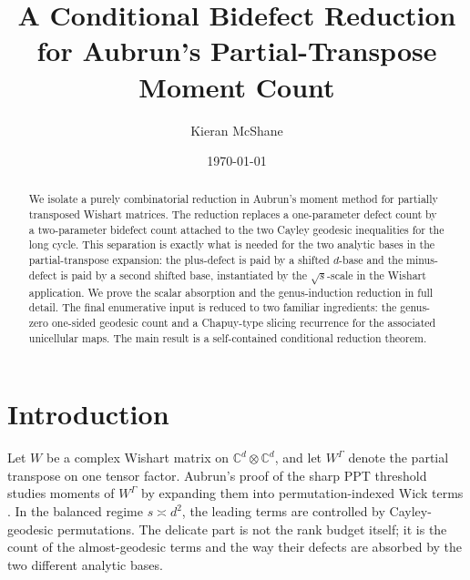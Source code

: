 \documentclass[11pt]{article}
\title{A Conditional Bidefect Reduction for Aubrun's Partial-Transpose Moment Count}
\author{Kieran McShane}
\date{\today}
\numberwithin{equation}{section}
\newcommand{\C}{\mathbb C}
\begin{document}
\maketitle

\begin{abstract}
We isolate a purely combinatorial reduction in Aubrun's moment method for
partially transposed Wishart matrices.  The reduction replaces a one-parameter
defect count by a two-parameter bidefect count attached to the two Cayley
geodesic inequalities for the long cycle.  This separation is exactly what is
needed for the two analytic bases in the partial-transpose expansion: the
plus-defect is paid by a shifted \(d\)-base and the minus-defect is paid by a
second shifted base, instantiated by the \(\sqrt{s}\)-scale in the Wishart
application.  We prove the scalar absorption and the
genus-induction reduction in full detail.  The final enumerative input is
reduced to two familiar ingredients: the genus-zero one-sided geodesic count
and a Chapuy-type slicing recurrence for the associated unicellular maps.
The main result is a self-contained conditional reduction theorem.
\end{abstract}

\tableofcontents

\section{Introduction}

Let \(W\) be a complex Wishart matrix on
\(\C^d\otimes \C^d\), and let \(W^\Gamma\) denote the partial transpose on one
tensor factor.  Aubrun's proof of the sharp PPT threshold studies moments of
\(W^\Gamma\) by expanding them into permutation-indexed Wick terms
\cite{Aubrun2012}.  In the balanced regime \(s\asymp d^2\), the leading
terms are controlled by Cayley-geodesic permutations.  The delicate part is
not the rank budget itself; it is the count of the almost-geodesic terms and
the way their defects are absorbed by the two different analytic bases.
\end{document}
